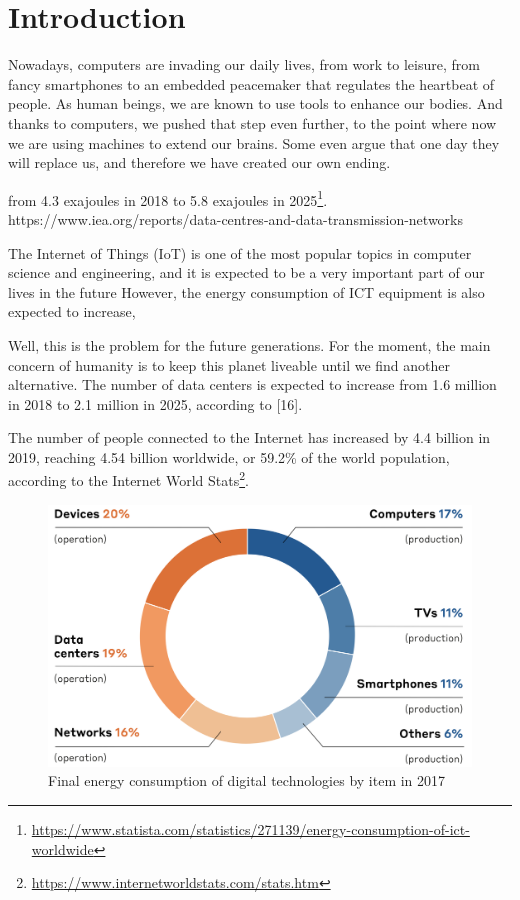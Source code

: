 \newpage

\chapter{Introduction }

\label{chapter:introduction}

Nowadays, computers are invading our daily lives, from work to leisure, from fancy smartphones to an embedded peacemaker that regulates the heartbeat of people.
As human beings, we are known to use tools to enhance our bodies. And thanks to computers, we pushed that step even further, to the point where now we are using machines to extend our brains. Some even argue that one day they will replace us, and therefore we have created our own ending.


from 4.3 exajoules in 2018 to 5.8 exajoules in 2025\footnote{\url{https://www.statista.com/statistics/271139/energy-consumption-of-ict-worldwide}}.
https://www.iea.org/reports/data-centres-and-data-transmission-networks

The Internet of Things (IoT) is one of the most popular topics in computer science and engineering, and it is expected to be a very important part of our lives in the future
However, the energy consumption of ICT equipment is also expected to increase,

Well, this is the problem for the future generations. For the moment, the main concern of humanity is to keep this planet liveable until we find another alternative.
The number of data centers is expected to increase from 1.6 million in 2018 to 2.1 million in 2025, according to [16].

The number of people connected to the Internet has increased by 4.4 billion in 2019, reaching 4.54 billion worldwide, or 59.2\% of the world population, according to the Internet World Stats\footnote{\url{https://www.internetworldstats.com/stats.htm}}.

\begin{figure}
    \includegraphics[width=\linewidth]{chapters/distribution_of_ict_consumption.png}
    \caption{Final energy consumption of digital technologies by item in 2017}
    \label{fig:distribution_of_ict_consumption}
\end{figure}

